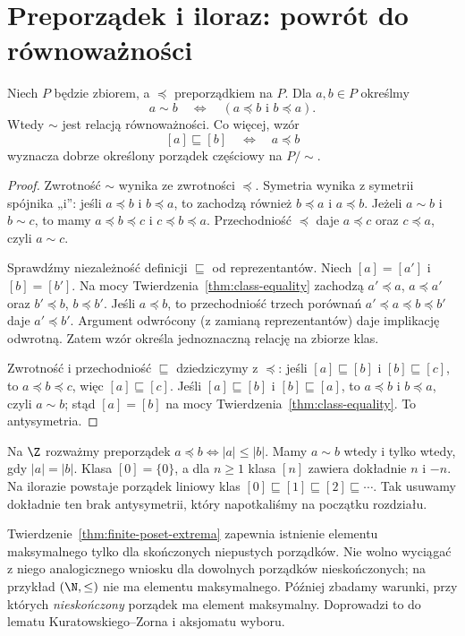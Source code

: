 \section{Preporządek i iloraz: powrót do równoważności}
\label{sec:order-prequotient}
\begin{twierdzenie}
\label{thm:preorder-quotient}
Niech $P$ będzie zbiorem, a $\preceq$ preporządkiem na $P$.
Dla $a,b\in P$ określmy
\[
 a\sim b\quad\Longleftrightarrow\quad
 (a\preceq b\text{ i }b\preceq a).
\]
Wtedy $\sim$ jest relacją równoważności. Co więcej,
wzór
\[
 [a]\sqsubseteq[b]\quad\Longleftrightarrow\quad a\preceq b
\]
wyznacza dobrze określony porządek częściowy na $P/{\sim}$.
\end{twierdzenie}
\begin{proof}
Zwrotność $\sim$ wynika ze zwrotności $\preceq$.
Symetria wynika z symetrii spójnika „i”: jeśli
$a\preceq b$ i $b\preceq a$, to zachodzą również
$b\preceq a$ i $a\preceq b$. Jeżeli $a\sim b$ i
$b\sim c$, to mamy $a\preceq b\preceq c$ i
$c\preceq b\preceq a$. Przechodniość $\preceq$
daje $a\preceq c$ oraz $c\preceq a$, czyli $a\sim c$.

Sprawdźmy niezależność definicji $\sqsubseteq$ od
reprezentantów. Niech $[a]=[a']$ i $[b]=[b']$.
Na mocy Twierdzenia~\ref{thm:class-equality} zachodzą
$a'\preceq a$, $a\preceq a'$ oraz
$b'\preceq b$, $b\preceq b'$.
Jeśli $a\preceq b$, to przechodniość trzech
porównań $a'\preceq a\preceq b\preceq b'$ daje
$a'\preceq b'$. Argument odwrócony (z zamianą
reprezentantów) daje implikację odwrotną.
Zatem wzór określa jednoznaczną relację na zbiorze klas.

Zwrotność i przechodniość $\sqsubseteq$ dziedziczymy
z $\preceq$: jeśli $[a]\sqsubseteq[b]$ i
$[b]\sqsubseteq[c]$, to $a\preceq b\preceq c$,
więc $[a]\sqsubseteq[c]$.
Jeśli $[a]\sqsubseteq[b]$ i $[b]\sqsubseteq[a]$,
to $a\preceq b$ i $b\preceq a$, czyli $a\sim b$;
stąd $[a]=[b]$ na mocy
Twierdzenia~\ref{thm:class-equality}. To antysymetria.
\end{proof}

\begin{przyklad}
Na $\Z$ rozważmy preporządek $a\preceq b\iff |a|\le|b|$.
Mamy $a\sim b$ wtedy i tylko wtedy, gdy $|a|=|b|$.
Klasa $[0]=\{0\}$, a dla $n\ge1$ klasa $[n]$
zawiera dokładnie $n$ i $-n$. Na ilorazie powstaje
porządek liniowy klas
$[0]\sqsubseteq[1]\sqsubseteq[2]\sqsubseteq\cdots$.
Tak usuwamy dokładnie ten brak antysymetrii,
który napotkaliśmy na początku rozdziału.
\end{przyklad}

\begin{uwaga}
Twierdzenie~\ref{thm:finite-poset-extrema} zapewnia istnienie
elementu maksymalnego tylko dla skończonych niepustych porządków.
Nie wolno wyciągać z niego analogicznego wniosku dla dowolnych
porządków nieskończonych; na przykład $(\N,\le)$ nie ma
elementu maksymalnego. Później zbadamy warunki, przy których
\emph{nieskończony} porządek ma element maksymalny. Doprowadzi
to do lematu Kuratowskiego--Zorna i aksjomatu wyboru.
\end{uwaga}

